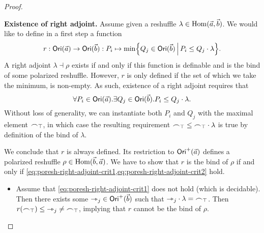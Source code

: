 \documentclass[a4paper]{memoir}
\begin{document}
\begin{proof}
\begin{enumerate}
\begin{itemize}
		\end{itemize}
		
		\textbf{Existence of right adjoint.}
		Assume given a reshuffle $\lambda \in {\mathrm{Hom}}(\vec a, \vec b)$.
		We would like to define in a first step a function
		\[
			r : {\mathsf{Ori}}(\vec a) \to {\mathsf{Ori}}(\vec b) : P_i \mapsto \min \mathopen{}\left\{ Q_j \in {\mathsf{Ori}}(\vec b) \,\middle|\, P_i \leq Q_j \cdot \lambda \right\}\mathclose{}.
		\]
		A right adjoint $\lambda \dashv \rho$ exists if and only if this function is definable and is the bind of some polarized reshuffle.
		However, $r$ is only defined if the set of which we take the minimum, is non-empty.
		As such, existence of a right adjoint requires that
		\[
			\forall P_i \in {\mathsf{Ori}}(\vec a) . \exists Q_j \in {\mathsf{Ori}}(\vec b). P_i \leq Q_j \cdot \lambda.
		\]
		Without loss of generality, we can instantiate both $P_i$ and $Q_j$ with the maximal element ${\frown}_\top$, in which case the resulting requirement ${\frown}_\top \leq {\frown}_\top \cdot \lambda$ is true by definition of the bind of $\lambda$.
		
		We conclude that $r$ is always defined.
		Its restriction to ${\mathsf{Ori}}^+(\vec a)$ defines a polarized reshuffle $\rho \in {\mathrm{Hom}}(\vec b, \vec a)$.
		We have to show that $r$ is the bind of $\rho$ if and only if \cref{eq:poresh-right-adjoint-crit1,eq:poresh-right-adjoint-crit2} hold.
		\begin{itemize}
			\item Assume that \cref{eq:poresh-right-adjoint-crit1} does not hold (which is decidable).
			Then there exists some ${\rightarrowtriangle}_j \in {\mathsf{Ori}}^+(\vec b)$ such that ${\rightarrowtriangle}_j \cdot \lambda = {\frown}_\top$.
			Then $r({\frown}_\top) \leq {\rightarrowtriangle}_j \neq {\frown}_\top$, implying that $r$ cannot be the bind of $\rho$.
			

\end{itemize}
\end{enumerate}
\end{proof}
\end{document}
